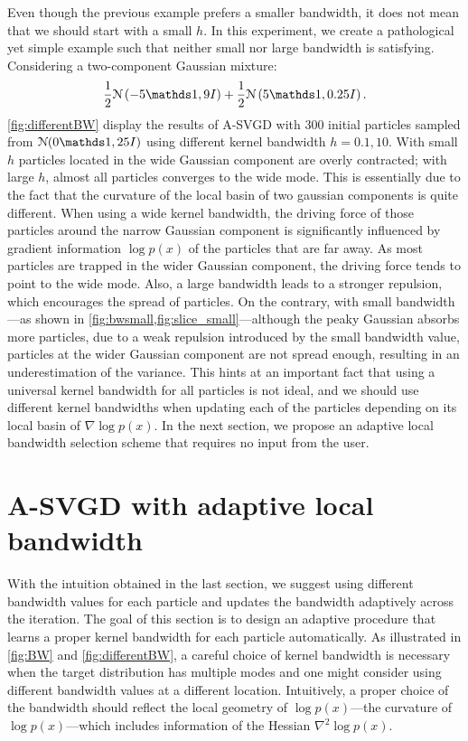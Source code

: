 Even though the previous example prefers a smaller bandwidth, it does not mean that we should start with a small $h$.
In this experiment, we create a pathological yet simple example such that neither small nor large bandwidth is satisfying.  
Considering a two-component Gaussian mixture:
\[
\frac{1}{2}\distNorm\left( -5 \ind, 9I \right)  + \frac{1}{2}\distNorm\left( 5\ind, 0.25I \right).
\]
\cref{fig:differentBW} display the results of A-SVGD with $300$ initial particles sampled from $\distNorm(0\ind, 25I )$ using different kernel bandwidth $h = 0.1, 10$. With small $h$ particles located in the wide Gaussian component are overly contracted; with large $h$, almost all particles converges to the wide mode.
This is essentially due to the fact that the curvature of the local basin of two gaussian components is quite different. When using a wide kernel bandwidth, the driving force of those particles around the narrow Gaussian component is significantly influenced by gradient information $\log p(x)$ of the particles that are far away. As most particles are trapped in the wider Gaussian component, the driving force tends to point to the wide mode. Also, a large bandwidth leads to a stronger repulsion, which encourages the spread of particles. On the contrary, with small bandwidth---as shown in \cref{fig:bwsmall,fig:slice_small}---although the peaky Gaussian absorbs more particles, due to a weak repulsion introduced by the small bandwidth value,  particles at the wider Gaussian component are not spread enough, resulting in an underestimation of the variance. 
This hints at an important fact that using a universal kernel bandwidth for all particles is not ideal, and we should use different kernel bandwidths when updating each of the particles depending on its local basin of $\nabla \log p(x)$. In the next section, we propose an adaptive local bandwidth selection scheme that requires no input from the user. 




\section{A-SVGD with adaptive local bandwidth} \label{sec:bw}
With the intuition obtained in the last section, we suggest using different bandwidth values for each particle and updates the bandwidth adaptively across the iteration.
The goal of this section is to design an adaptive procedure that learns a proper kernel bandwidth for each particle automatically.    
As illustrated in \cref{fig:BW} and \cref{fig:differentBW}, a careful choice of kernel bandwidth is necessary when the target distribution has multiple modes and one might consider using different bandwidth values at a different location.  Intuitively, a proper choice of the bandwidth should reflect the local geometry of   $\log p(x)$---the curvature of $\log p(x)$---which includes information of the Hessian $\nabla^2 \log p(x)$.  

